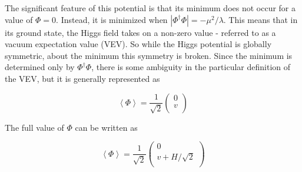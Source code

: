 The significant feature of this potential is that its minimum does not occur for a value of $\Phi = 0$. Instead, it is minimized when $|\Phi^\dagger \Phi| = -\mu^2/\lambda$. This means that in its ground state, the Higgs field takes on a non-zero value - referred to as a vacuum expectation value (VEV). So while the Higgs potential is globally symmetric, about the minimum this symmetry is broken. Since the minimum is determined only by $\Phi^\dagger \Phi$, there is some ambiguity in the particular definition of the VEV, but it is generally represented as 

\begin{equation}
  \label{eq:VEV}
  \left\langle\Phi\right\rangle = \frac{1}{\sqrt{2}}
  \begin{pmatrix}                                                                                                                               
    0 \\                                                                                                                                   
    v \\                                                                                                                                   
  \end{pmatrix}                                                                                                                       
\end{equation}

The full value of $\Phi$ can be written as 

\begin{equation}                                                                                                                                
  \label{eq:HandV}                                                                                                                                  \left\langle\Phi\right\rangle = \frac{1}{\sqrt{2}}                                                                     
  \begin{pmatrix}                                                                                                                               
    0 \\                                                                                                                   
    v + H/\sqrt{2}\\                                               
  \end{pmatrix}                                                                                                                        
\end{equation}

